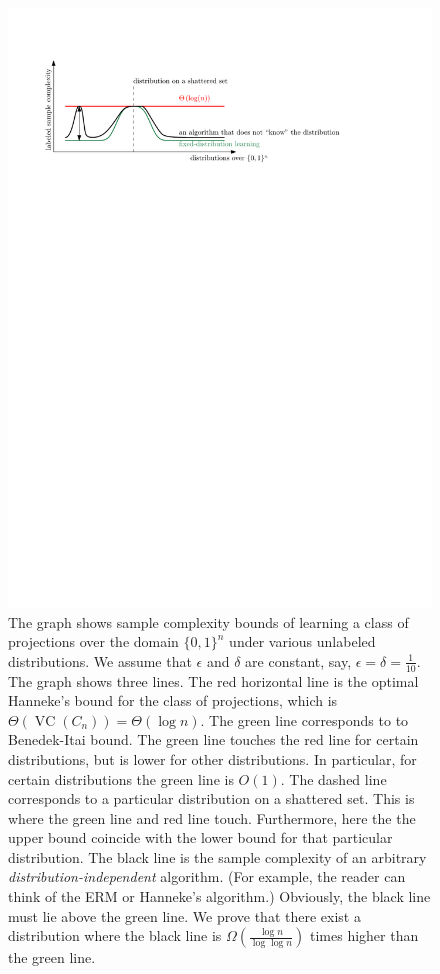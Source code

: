 \documentclass[10pt]{article}
\DeclareMathOperator{\VC}{VC}
\begin{document}
\begin{figure}
\centering
\includegraphics{figure}
\caption{The graph shows sample complexity bounds of learning a class of
projections over the domain $\{0,1\}^n$ under various unlabeled distributions.
We assume that $\epsilon$ and $\delta$ are constant, say, $\epsilon = \delta =
\frac{1}{10}$. The graph shows three lines. The red horizontal line is the
optimal Hanneke's bound for the class of projections, which is
$\Theta(\VC(C_n)) = \Theta(\log n)$. The green line corresponds to to
Benedek-Itai bound. The green line touches the red line for certain
distributions, but is lower for other distributions. In particular, for certain
distributions the green line is $O(1)$. The dashed line corresponds
to a particular distribution on a shattered set. This is where the green line
and red line touch. Furthermore, here the the upper bound coincide
with the lower bound for that particular distribution.
The black line is the sample complexity
of an arbitrary \emph{distribution-independent} algorithm. (For example, the
reader can think of the ERM or Hanneke's algorithm.) Obviously, the black line
must lie above the green line. We prove that there exist a distribution where
the black line is $\Omega(\frac{\log n}{\log \log n})$ times higher than the
green line.} \label{figure:sample-complexity}
\end{figure}
\end{document}
